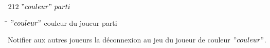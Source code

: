 \par

$212 ~ "couleur" ~ parti$

\begin{tabbing}
\hspace{2cm}\=\kill
 $"couleur"$ \> couleur du joueur parti 
\end{tabbing} 

Notifier aux autres joueurs la déconnexion au jeu du joueur de couleur $"couleur"$. \\